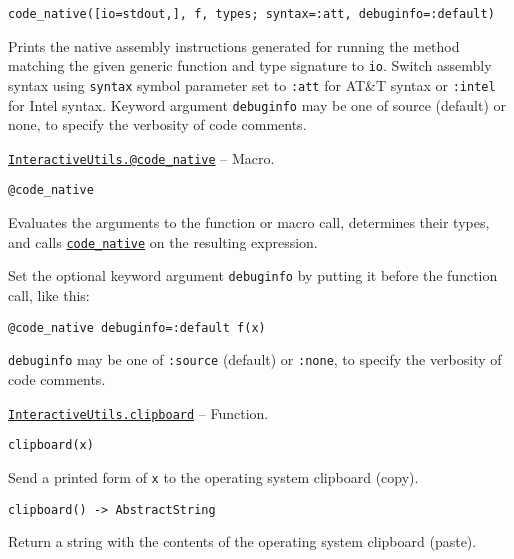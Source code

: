 \begin{adjustwidth}{2em}{0pt}


\begin{verbatim}
code_native([io=stdout,], f, types; syntax=:att, debuginfo=:default)
\end{verbatim}

Prints the native assembly instructions generated for running the method matching the given generic function and type signature to \texttt{io}. Switch assembly syntax using \texttt{syntax} symbol parameter set to \texttt{:att} for AT\&T syntax or \texttt{:intel} for Intel syntax. Keyword argument \texttt{debuginfo} may be one of source (default) or none, to specify the verbosity of code comments.



\end{adjustwidth}
\hypertarget{2629340111434042067}{} 
\hyperlink{2629340111434042067}{\texttt{InteractiveUtils.@code\_native}}  -- {Macro.}

\begin{adjustwidth}{2em}{0pt}


\begin{verbatim}
@code_native
\end{verbatim}

Evaluates the arguments to the function or macro call, determines their types, and calls \hyperlink{2534314152947301270}{\texttt{code\_native}} on the resulting expression.

Set the optional keyword argument \texttt{debuginfo} by putting it before the function call, like this:


\begin{lstlisting}
@code_native debuginfo=:default f(x)
\end{lstlisting}

\texttt{debuginfo} may be one of \texttt{:source} (default) or \texttt{:none}, to specify the verbosity of code comments.



\end{adjustwidth}
\hypertarget{17688389159658604177}{} 
\hyperlink{17688389159658604177}{\texttt{InteractiveUtils.clipboard}}  -- {Function.}

\begin{adjustwidth}{2em}{0pt}


\begin{verbatim}
clipboard(x)
\end{verbatim}

Send a printed form of \texttt{x} to the operating system clipboard ({\textquotedbl}copy{\textquotedbl}).




\begin{lstlisting}
clipboard() -> AbstractString
\end{lstlisting}

Return a string with the contents of the operating system clipboard ({\textquotedbl}paste{\textquotedbl}).



\end{adjustwidth}

